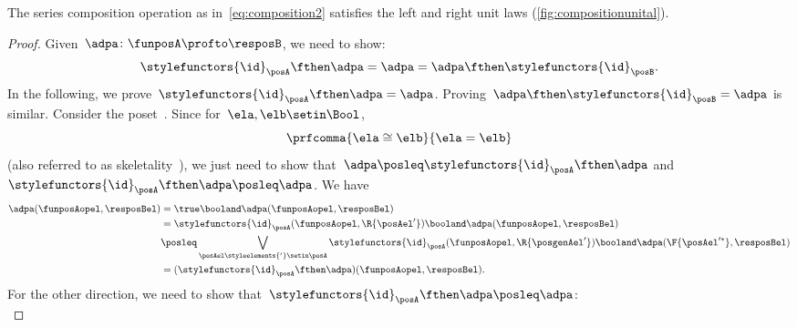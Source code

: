 
\begin{lemma}
    \label{lem:compositionunital}
    The series composition operation as in~\cref{eq:composition2} satisfies the left and right unit laws (\cref{fig:compositionunital}).
\end{lemma}


\begin{proof}
    Given~$\adpa\colon \funposA\profto \resposB$, we need to show:
    \begin{equation}
        \stylefunctors{\id}_\posA \fthen \adpa = \adpa = \adpa \fthen \stylefunctors{\id}_\posB.
    \end{equation}
    In the following, we prove~$\stylefunctors{\id}_\posA \fthen \adpa = \adpa$.
    Proving~$\adpa\fthen \stylefunctors{\id}_\posB=\adpa$ is similar.
    Consider the poset~\Bool.
    Since for~$\ela,\elb\setin \Bool$,
    \begin{equation}
        \prfcomma{
            \ela\cong \elb
        }{
            \ela=\elb
        }
    \end{equation}
    (also referred to as skeletality~\cite{fong2019}), we just need to show that~$\adpa\posleq \stylefunctors{\id}_\posA\fthen \adpa$ and~$\stylefunctors{\id}_\posA\fthen \adpa\posleq \adpa$.
    We have
    \begin{equation}
        \label{eq:dp_unit_1}
        \begin{aligned}
            \adpa(\funposAopel,\resposBel) & =\true \booland \adpa(\funposAopel,\resposBel) \\
                                           & = \stylefunctors{\id}_\posA(\funposAopel,\R{\posAel'}) \booland \adpa(\funposAopel,\resposBel) \\
                                           & \posleq \bigvee_{\posAel\styleelements{'} \setin \posA}\stylefunctors{\id}_\posA(\funposAopel,\R{\posgenAel'})\booland \adpa(\F{\posAel'^*},\resposBel) \\
                                           & =(\stylefunctors{\id}_\posA\fthen \adpa)(\funposAopel,\resposBel).
        \end{aligned}
    \end{equation}
    For the other direction, we need to show that~$\stylefunctors{\id}_\posA\fthen \adpa\posleq \adpa$:
    \begin{equation}
        \label{eq:dp_unit_2}

\end{equation}
\end{proof}
